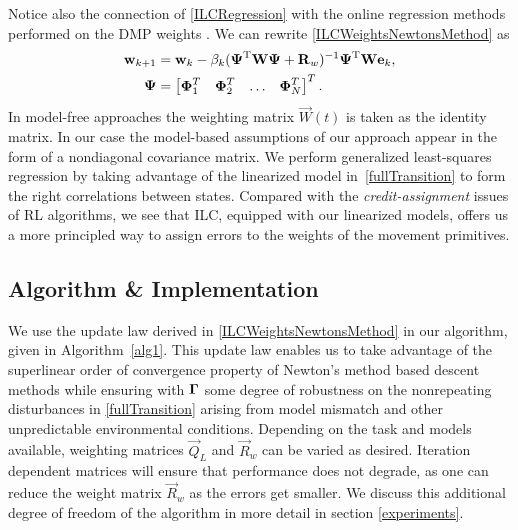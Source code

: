 %
%
\noindent Notice also the connection of \eqref{ILCRegression} with the online regression methods performed on the DMP weights \cite{Ijspeert13}. We can rewrite \eqref{ILCWeightsNewtonsMethod} as
%
\begin{equation}
\begin{aligned}
\boldsymbol{\mathrm{w}}_{k+1} &= \boldsymbol{\mathrm{w}}_k - \beta_k(\boldsymbol{\mathrm{\Psi}}^{\mathrm{T}}\boldsymbol{\mathrm{W}}\boldsymbol{\mathrm{\Psi}} + \boldsymbol{\mathrm{R}}_{w})^{-1}\boldsymbol{\mathrm{\Psi}}^{\mathrm{T}}\boldsymbol{\mathrm{W}}\boldsymbol{\mathrm{e}}_k, \\
\boldsymbol{\mathrm{\Psi}} &= \begin{bmatrix}
  \boldsymbol{\mathrm{\Phi}}_1^{T} & \boldsymbol{\mathrm{\Phi}}_2^{T} & \ldots & \boldsymbol{\mathrm{\Phi}}_N^{T}
 \end{bmatrix}^{T}.
\end{aligned}
\label{ILCRegression}
\end{equation}
%
%
In model-free approaches the weighting matrix $\vec{W}(t)$ is taken as the identity matrix. In our case the model-based assumptions of our approach appear in the form of a nondiagonal covariance matrix. We perform generalized least-squares regression by taking advantage of the linearized model in~\eqref{fullTransition} to form the right correlations between states. Compared with the \emph{credit-assignment} issues of RL algorithms, we see that ILC, equipped with our linearized models, offers us a more principled way to assign errors to the weights of the movement primitives.


\subsection{Algorithm \& Implementation}\label{algorithm}

We use the update law derived in \eqref{ILCWeightsNewtonsMethod} in our algorithm, given in Algorithm~\ref{alg1}. This update law enables us to take advantage of the superlinear order of convergence property of Newton's method based descent methods while ensuring with $\boldsymbol{\mathrm{\Gamma}}$ some degree of robustness on the nonrepeating disturbances in \eqref{fullTransition} arising from model mismatch and other unpredictable environmental conditions. Depending on the task and models available, weighting matrices $\vec{Q}_{L}$ and $\vec{R}_{w}$ can be varied as desired. Iteration dependent matrices will ensure that performance does not degrade, as one can reduce the weight matrix $\vec{R}_{w}$ as the errors get smaller. We discuss this additional degree of freedom of the algorithm in more detail in section \ref{experiments}.

